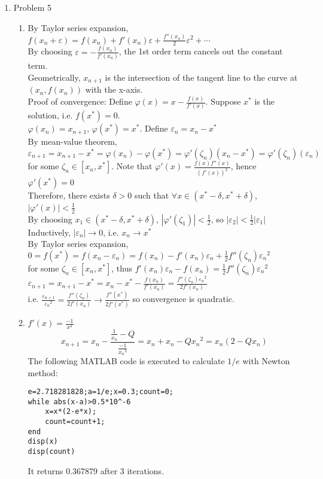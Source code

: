 \documentclass[leqno,12pt]{article}
\def\e{\varepsilon}
\def\z{\zeta}
\def\d{\delta}
\begin{document}
\begin{enumerate}
\item Problem 5
\begin{enumerate}
\item By Taylor series expansion, $f(x_n+\e)=f(x_n)+f'(x_n)\e+\frac{f''(x_n)}{2}\e^2+\cdots$\\
By choosing $\e=-\frac{f(x_n)}{f'(x_n)}$, the 1st order term cancels out the constant term.\\
Geometrically, $x_{n+1}$ is the intersection of the tangent line to the curve at $(x_n, f(x_n))$ with the x-axis.\\
Proof of convergence: Define $\varphi(x)=x-\frac{f(x)}{f'(x)}$. Suppose $x^*$ is the solution, i.e. $f(x^*)=0$.\\
$\varphi(x_n)=x_{n+1}$, $\varphi(x^*)=x^*$. Define $\e_n=x_n-x^*$\\
By mean-value theorem, $\e_{n+1}=x_{n+1}-x^*=\varphi(x_n)-\varphi(x^*)=\varphi'(\z_n)(x_n-x^*)=\varphi'(\z_n)(\e_n)$\\
for some $\z_n\in[x_n,x^*]$. Note that $\varphi'(x)=\frac{f(x)f''(x)}{(f'(x))^2}$, hence $\varphi'(x^*)=0$\\
Therefore, there exists $\d>0$ such that $\forall x\in (x^*-\d, x^*+\d)$, $|\varphi'(x)|<\frac{1}{2}$\\
By choosing $x_1\in(x^*-\d, x^*+\d)$, $|\varphi'(\z_1)|<\frac{1}{2}$, so $|\e_2|<\frac{1}{2}|\e_1|$\\
Inductively, $|\e_n|\rightarrow 0$, i.e. $x_n\rightarrow x^*$\\
By Taylor series expansion, $0=f(x^*)=f(x_n-\e_n)=f(x_n)-f'(x_n)\e_n+\frac{1}{2}f''(\z_n){\e_n}^2$\\
for some $\z_n\in[x_n, x^*]$, thus $f'(x_n)\e_n-f(x_n)=\frac{1}{2}f''(\z_n){\e_n}^2$\\
$\e_{n+1}=x_{n+1}-x^*=x_n-x^*-\frac{f(x_n)}{f'(x_n)}=\frac{f''(\z_n){\e_n}^2}{2f'(x_n)}$\\
i.e. $\frac{\e_{n+1}}{{\e_n}^2}=\frac{f''(\z_n)}{2f'(x_n)}\rightarrow\frac{f''(x^*)}{2f'(x^*)}$
so convergence is quadratic.
\item $f'(x)=\frac{-1}{x^2}$
\[x_{n+1}=x_n-\frac{\frac{1}{x_n}-Q}{\frac{-1}{{x_n}^2}}=x_n+x_n-Q{x_n}^2=x_n(2-Qx_n)\]
The following MATLAB code is executed to calculate $1/e$ with Newton method:
\begin{verbatim}
e=2.718281828;a=1/e;x=0.3;count=0;
while abs(x-a)>0.5*10^-6
    x=x*(2-e*x);
    count=count+1;
end
disp(x)
disp(count)
\end{verbatim}
It returns 0.367879 after 3 iterations.\\

\end{enumerate}
\end{enumerate}
\end{document}
